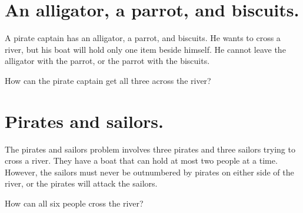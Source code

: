 \documentclass{article}
\begin{document}
\Large

\section*{An alligator, a parrot, and biscuits.}

A pirate captain has an alligator, a parrot, and biscuits. He wants to
cross a river, but his boat will hold only one item beside himself. He
cannot leave the alligator with the parrot, or the parrot with the
biscuits.

How can the pirate captain get all three across the river?

\section*{Pirates and sailors.}

The pirates and sailors problem involves three pirates and three
sailors trying to cross a river. They have a boat that can hold at
most two people at a time. However, the sailors must never be
outnumbered by pirates on either side of the river, or the pirates
will attack the sailors.

How can all six people cross the river?
\end{document}
